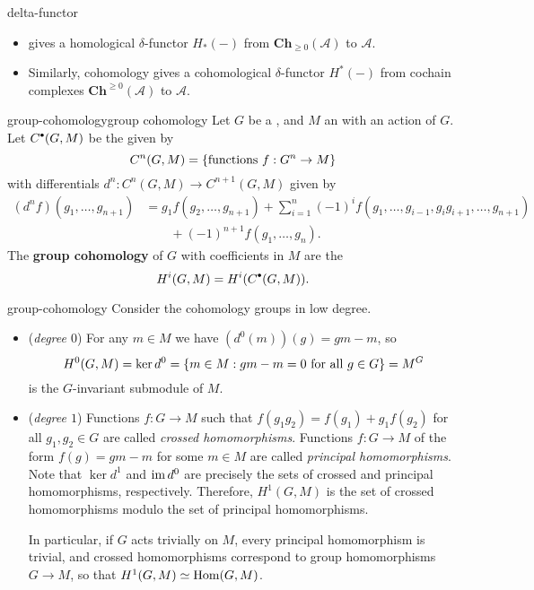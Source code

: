 \begin{example}{delta-functor}
    \begin{itemize}
        \item {} gives a homological $\delta$-functor $H_*(-)$ from  $\textbf{Ch}_{\ge 0}(\mathcal{A})$ to $\mathcal{A}$.
        \item Similarly, cohomology gives a cohomological $\delta$-functor $H^*(-)$ from cochain complexes $\textbf{Ch}^{\ge 0}(\mathcal{A})$ to $\mathcal{A}$.
    \end{itemize}
\end{example}

\begin{topic}{group-cohomology}{group cohomology}
    Let $G$ be a , and $M$ an  with an action of $G$. Let $C^\bdot(G, M)$ be the  given by
    \[ C^n(G, M) = \{ \textup{functions } f : G^n \to M \} \]
    with differentials $d^n : C^n(G, M) \to C^{n + 1}(G, M)$ given by
    \[ \begin{aligned} (d^n f)(g_1, \ldots, g_{n + 1}) &= g_1 f(g_2, \ldots, g_{n + 1}) + \sum_{i = 1}^{n} (-1)^i f(g_1, \ldots, g_{i - 1}, g_i g_{i + 1}, \ldots, g_{n + 1}) \\ &\qquad + (-1)^{n + 1} f(g_1, \ldots, g_n) . \end{aligned} \]
    The \textbf{group cohomology} of $G$ with coefficients in $M$ are the 
    \[ H^i(G, M) = H^i(C^\bdot(G, M)) . \]
\end{topic}

\begin{example}{group-cohomology}
    Consider the cohomology groups in low degree.
    \begin{itemize}
        \item (\textit{degree $0$}) For any $m \in M$ we have $(d^0(m))(g) = gm - m$, so
        \[ H^0(G, M) = \ker d^0 = \{ m \in M : gm - m = 0 \textup{ for all } g \in G \} = M^G \]
        is the $G$-invariant submodule of $M$.
        \item (\textit{degree $1$}) Functions $f : G \to M$ such that $f(g_1 g_2) = f(g_1) + g_1 f(g_2)$ for all $g_1, g_2 \in G$ are called \textit{crossed homomorphisms}. Functions $f : G \to M$ of the form $f(g) = gm - m$ for some $m \in M$ are called \textit{principal homomorphisms}. Note that $\ker d^1$ and $\operatorname{im} d^0$ are precisely the sets of crossed and principal homomorphisms, respectively. Therefore, $H^1(G, M)$ is the set of crossed homomorphisms modulo the set of principal homomorphisms.
        
        In particular, if $G$ acts trivially on $M$, every principal homomorphism is trivial, and crossed homomorphisms correspond to group homomorphisms $G \to M$, so that $H^1(G, M) \simeq \text{Hom}(G, M)$.
    \end{itemize}
\end{example}

